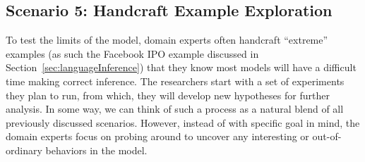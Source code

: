 \subsection{Scenario 5: Handcraft Example Exploration}
To test the limits of the model, domain experts often handcraft ``extreme'' examples (as such the Facebook IPO example discussed in Section~\ref{sec:languageInference}) that they know most models will have a difficult time making correct inference.
%
The researchers start with a set of experiments they plan to run, from which, they will develop new hypotheses for further analysis.
%
In some way, we can think of such a process as a natural blend of all previously discussed scenarios. However, instead of with specific goal in mind, the domain experts focus on probing around to uncover any interesting or out-of-ordinary behaviors in the model.
%


